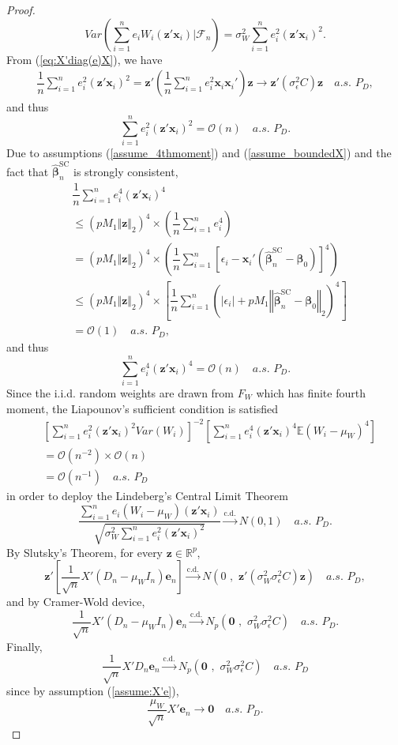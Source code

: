 \documentclass[ejs,authoryear,linksfromyear]{imsart}
\newcommand{\sumin}{\sum_{i=1}^n} %
\newcommand{\CONV}[1]{\stackrel{\text{#1}}{\longrightarrow}} %
\newcommand{\bSC}{\widehat{\bm{\beta}}_n^{\text{SC}}} %
\numberwithin{equation}{section}
\theoremstyle{plain}
\begin{document}
\begin{proof}
$$	Var \left(
		\sumin e_i W_i (\bm{z}' \bm{x}_i)
		\bigg| \mathcal{F}_n 
	\right)
	= \sigma^2_W \sumin e_i^2  (\bm{z}' \bm{x}_i)^2.
	$$
	From (\ref{eq:X'diag(e)X}), we have
	\begin{align*}
	\dfrac{1}{n} \sumin e_i^2 (\bm{z}' \bm{x}_i)^2 
	=  \bm{z}' \left( 
		\dfrac{1}{n} \sumin e_i^2 \bm{x}_i \bm{x}_i'
	\right) \bm{z} 
	\to \bm{z}' \left(
		\sigma^2_\epsilon C
 	\right) \bm{z} 
 	\quad a.s. \,\, P_D,
	\end{align*}
	and thus
	$$
	\sumin e_i^2 (\bm{z}' \bm{x}_i)^2 
	= \mathcal{O}(n) \quad a.s. \,\, P_D.
	$$
	Due to assumptions (\ref{assume_4thmoment}) and (\ref{assume_boundedX}) and the fact that $\bSC$ is strongly consistent,
	\begin{align*}
	&\dfrac{1}{n} \sumin e_i^4 (\bm{z}' \bm{x}_i)^4 \\
	&\leq (p M_1 \Vert \bm{z} \Vert_2)^4 
	\times \left( \dfrac{1}{n} \sumin e_i^4 \right) \\
	&= (p M_1 \Vert \bm{z} \Vert_2)^4 \times
	\left( 
		\dfrac{1}{n} \sumin 
		\left[ 
			\epsilon_i - \bm{x}_i' \left( \bSC - \bm{\beta}_0 \right)  
		\right]^4 
	\right) \\
	&\leq (p M_1 \Vert \bm{z} \Vert_2)^4 \times
	\left[
		\dfrac{1}{n} \sumin 
		\left(
			|\epsilon_i| + p M_1 \left\Vert \bSC - \bm{\beta}_0 \right\Vert_2  
		\right)^4 
	\right] \\
	&= \mathcal{O}(1) \quad a.s. \,\, P_D,
	\end{align*}
	and thus
	$$
	\sumin e_i^4 (\bm{z}' \bm{x}_i)^4 
	= \mathcal{O}(n) \quad a.s. \,\, P_D.
	$$
	Since the i.i.d. random weights are drawn from $F_W$ which has finite fourth moment, the Liapounov's sufficient condition is satisfied 
	\begin{align*}
	&\left[ 
	\sumin e_i^2 (\bm{z}' \bm{x}_i)^2 Var(W_i) 
	\right]^{-2}
	\left[
	\sumin e_i^4 (\bm{z}' \bm{x}_i)^4 \mathbb{E} (W_i - \mu_W)^4
	\right] \\
	&= \mathcal{O} \left( n^{-2} \right)
	\times 
	\mathcal{O} \left( n \right) \\
	&= \mathcal{O} \left( n^{-1} \right) 
	\quad a.s. \,\, P_D
	\end{align*}
	in order to deploy the Lindeberg's Central Limit Theorem
	$$
	\dfrac{ \sumin e_i (W_i - \mu_W) (\bm{z}' \bm{x}_i) }
	{ \sqrt{ \sigma^2_W \sumin e_i^2 (\bm{z}' \bm{x}_i)^2 } }
	\CONV{c.d.} N(0,1) 
	\quad a.s. \,\, P_D.
	$$
	By Slutsky's Theorem, for every $\bm{z} \in \mathbb{R}^p$, 
	$$
	\bm{z}' \left[
		\dfrac{1}{\sqrt{n}} X' (D_n - \mu_W I_n) \bm{e}_n
	\right]
	\CONV{c.d.} N \left( 0 \,\, , \,\, \bm{z}' \left( \sigma^2_W \sigma^2_\epsilon C \right)  \bm{z} \right) 
	\quad a.s. \,\, P_D,
	$$
	and by Cramer-Wold device,
	$$
	\dfrac{1}{\sqrt{n}} X' (D_n - \mu_W I_n) \bm{e}_n
	\CONV{c.d.} N_p \left( \bm{0} \,\, , \,\, \sigma^2_W \sigma^2_\epsilon C \right) 
	\quad a.s. \,\, P_D.
	$$
	Finally,
	$$
	\dfrac{1}{\sqrt{n}} X' D_n \bm{e}_n
	\CONV{c.d.} N_p \left( \bm{0} \,\, , \,\, \sigma^2_W \sigma^2_\epsilon C \right) 
	\quad a.s. \,\, P_D
	$$
	since by assumption (\ref{assume:X'e}),
	$$
	\dfrac{\mu_W}{\sqrt{n}} X' \bm{e}_n \to \bm{0}
	\quad a.s. \,\, P_D. 
	$$
	

\end{proof}
\end{document}

